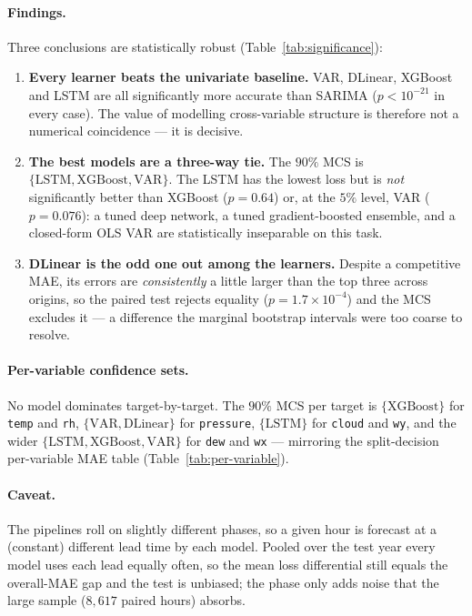 \documentclass[12pt,a4paper,oneside]{report}
\begin{document}
\paragraph{Findings.} Three conclusions are statistically robust
(Table~\ref{tab:significance}):
\begin{enumerate}
  \item \textbf{Every learner beats the univariate baseline.} VAR, DLinear,
        XGBoost and LSTM are all significantly more accurate than SARIMA
        ($p<10^{-21}$ in every case). The value of modelling cross-variable
        structure is therefore not a numerical coincidence --- it is decisive.
  \item \textbf{The best models are a three-way tie.} The $90\%$ MCS is
        $\{\text{LSTM},\text{XGBoost},\text{VAR}\}$. The LSTM has the lowest loss
        but is \emph{not} significantly better than XGBoost ($p=0.64$) or, at the
        $5\%$ level, VAR ($p=0.076$): a tuned deep network, a tuned gradient-boosted
        ensemble, and a closed-form OLS VAR are statistically inseparable on this
        task.
  \item \textbf{DLinear is the odd one out among the learners.} Despite a
        competitive MAE, its errors are \emph{consistently} a little larger than the
        top three across origins, so the paired test rejects equality
        ($p=1.7\times10^{-4}$) and the MCS excludes it --- a difference the marginal
        bootstrap intervals were too coarse to resolve.
\end{enumerate}

\paragraph{Per-variable confidence sets.} No model dominates target-by-target. The
$90\%$ MCS per target is $\{\text{XGBoost}\}$ for \texttt{temp} and \texttt{rh},
$\{\text{VAR},\text{DLinear}\}$ for \texttt{pressure}, $\{\text{LSTM}\}$ for
\texttt{cloud} and \texttt{wy}, and the wider $\{\text{LSTM},\text{XGBoost},
\text{VAR}\}$ for \texttt{dew} and \texttt{wx} --- mirroring the split-decision
per-variable MAE table (Table~\ref{tab:per-variable}).

\paragraph{Caveat.} The pipelines roll on slightly different phases, so a given
hour is forecast at a (constant) different lead time by each model. Pooled over the
test year every model uses each lead equally often, so the mean loss differential
still equals the overall-MAE gap and the test is unbiased; the phase only adds
noise that the large sample ($8{,}617$ paired hours) absorbs.
\end{document}
